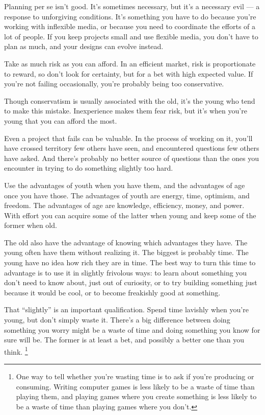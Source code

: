 \documentclass[12pt]{book}
\begin{document}
Planning per se isn't good. It's sometimes necessary, but it's a
necessary evil --- a response to unforgiving conditions. It's something
you have to do because you're working with inflexible media, or because
you need to coordinate the efforts of a lot of people. If you keep
projects small and use flexible media, you don't have to plan as much,
and your designs can evolve instead.

Take as much risk as you can afford. In an efficient market, risk is
proportionate to reward, so don't look for certainty, but for a bet with
high expected value. If you're not failing occasionally, you're probably
being too conservative.

Though conservatism is usually associated with the old, it's the young
who tend to make this mistake. Inexperience makes them fear risk, but
it's when you're young that you can afford the most.

Even a project that fails can be valuable. In the process of working on
it, you'll have crossed territory few others have seen, and encountered
questions few others have asked. And there's probably no better source
of questions than the ones you encounter in trying to do something
slightly too hard.

Use the advantages of youth when you have them, and the advantages of
age once you have those. The advantages of youth are energy, time,
optimism, and freedom. The advantages of age are knowledge, efficiency,
money, and power. With effort you can acquire some of the latter when
young and keep some of the former when old.

The old also have the advantage of knowing which advantages they have.
The young often have them without realizing it. The biggest is probably
time. The young have no idea how rich they are in time. The best way to
turn this time to advantage is to use it in slightly frivolous ways: to
learn about something you don't need to know about, just out of
curiosity, or to try building something just because it would be cool,
or to become freakishly good at something.

That ``slightly'' is an important qualification. Spend time lavishly
when you're young, but don't simply waste it. There's a big difference
between doing something you worry might be a waste of time and doing
something you know for sure will be. The former is at least a bet, and
possibly a better one than you think. \footnote{One way to tell whether you're wasting time is to ask if you're
producing or consuming. Writing computer games is less likely to be a
waste of time than playing them, and playing games where you create
something is less likely to be a waste of time than playing games where
you don't.}
\end{document}
